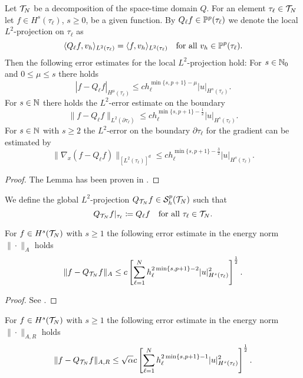 \documentclass[../thesis.tex]{subfiles}
\begin{document}
\begin{lemma}
\label{thm:L2-approximation-props}
Let $\mathcal{T}_N$ be a decomposition of the space-time domain $Q$.
For an element $\tau_\ell \in \mathcal{T}_N$ let $f \in H^s(\tau_\ell)$, $s \geq 0$, be a given function.
By $Q_\ell f \in \mathbb{P}^p(\tau_\ell)$ we denote the local $L^2$-projection on $\tau_\ell$ as
\[
	\langle Q_\ell f, v_h \rangle_{L^2(\tau_\ell)} = \langle f, v_h \rangle_{L^2(\tau_\ell)} \quad \text{for all } v_h \in \mathbb{P}^p(\tau_\ell).
\]
Then the following error estimates for the local $L^2$-projection hold:
For $s \in \mathbb{N}_0$ and $0 \leq \mu \leq s$ there holds
\[
	| f - Q_\ell f |_{H^\mu(\tau_\ell)} \leq ch_\ell^{\min\{s, p+1\} - \mu} |u|_{H^s(\tau_\ell)}.
\]
For $s \in \mathbb{N}$ there holds the $L^2$-error estimate on the boundary
\[
	\| f - Q_\ell f \|_{L^2(\partial \tau_\ell)} \leq ch_\ell^{\min\{s, p+1\} - \frac{1}{2}} |u|_{H^s(\tau_\ell)}.
\]
For $s \in \mathbb{N}$ with $s \geq 2$ the $L^2$-error on the boundary $\partial \tau_\ell$ for the gradient can be estimated by
\[
	\| \nabla_x (f - Q_\ell f) \|_{[L^2(\tau_\ell)]^d} \leq ch_\ell^{\min\{s, p+1\} - \frac{3}{2}} |u|_{H^s(\tau_\ell)}.
\]
\end{lemma}
\begin{proof}
The Lemma has been proven in \cite{DiPietroErn}.
\end{proof}
We define the global $L^2$-projection $Q_{\mathcal{T}_N} f \in \mathcal{S}_h^p(\mathcal{T}_N)$ such that
\[
	Q_{\mathcal{T}_N} f|_{\tau_\ell} \coloneqq Q_\ell f \quad \text{for all } \tau_\ell \in \mathcal{T}_N.
\]
\begin{lemma}
For $f \in H^s(\mathcal{T}_N)$ with $s \geq 1$ the following error estimate in the energy norm $\| \cdot \|_A$ holds
\[
	\| f - Q_{\mathcal{T}_N} f \|_A \leq c \left[ \sum_{\ell=1}^N h_\ell^{2 \min \{ s, p+ 1 \} -2 } |u|^2_{H^s(\tau_\ell)} \right]^\frac{1}{2}.
\]
\end{lemma}
\begin{proof}
See \cite[Lemma 2.2.24]{Neumueller}.
\end{proof}
\begin{lemma}
For $f \in H^s(\mathcal{T}_N)$ with $s \geq 1$ the following error estimate in the energy norm $\| \cdot \|_{A,R}$ holds
\[
	\| f - Q_{\mathcal{T}_N} f \|_{A,R} \leq \sqrt{\alpha} c \left[ \sum_{\ell=1}^N h_\ell^{2 \min \{ s, p+ 1 \} - 1} |u|^2_{H^s(\tau_\ell)} \right]^\frac{1}{2}.
\]
\end{lemma}
\end{document}
